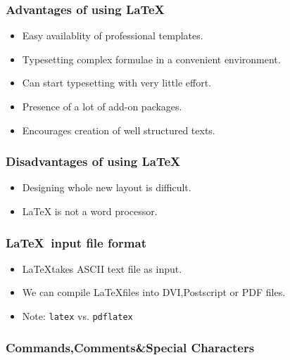 \documentclass[12pt,compress]{beamer}
\newcommand{\typ}[1]{\lstinline{#1}}
\begin{document}
\begin{frame}[fragile]
  \frametitle{Advantages of using \LaTeX }
  \begin{itemize}
    \item Easy availablity of professional templates.
    \item Typesetting complex formulae in a convenient environment.
    \item Can start typesetting with very little effort.
    \item Presence of a lot of add-on packages.
    \item Encourages creation of well structured texts.
  \end{itemize}
\end{frame}

\begin{frame}[fragile]
  \frametitle{Disadvantages of using \LaTeX }
  \begin{itemize}
    \item Designing whole new layout is difficult.
    \item LaTeX is not a word processor.
  \end{itemize}
\end{frame}

\begin{frame}[fragile]
  \frametitle{\LaTeX \ input file format}
  \begin{itemize}
    \item \LaTeX takes ASCII text file as input.
    \item We can compile \LaTeX files into DVI,Postscript or PDF files.
    \item \alert{Note:} \typ{latex} vs. \typ{pdflatex} 
  \end{itemize}
\end{frame}

\begin{frame}[fragile]
  \frametitle{Commands,Comments\&Special Characters }
\end{frame}
\end{document}
